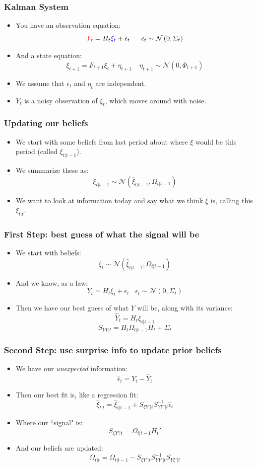 \documentclass{beamer}
\begin{document}
\begin{frame}
\frametitle[alignment=center]{Kalman System}
\begin{itemize}
\item You have an observation equation:
$$\textcolor{red}{Y_t}=H_t\textcolor{blue}{\xi_t}+\epsilon_t\ \ \ \ \ \epsilon_t\sim\mathcal{N}\left(0,\Sigma_t\right)$$
\item And a state equation:
$$\xi_{t+1}=F_{t+1}\xi_t+\eta_{t+1}\ \ \ \ \ \eta_{t+1}\sim\mathcal{N}\left(0,\Phi_{t+1}\right)$$
\item We assume that $\epsilon_t$ and $\eta_t$ are independent.
\bigskip
\item $Y_t$ is a noisy observation of $\xi_t$, which moves around with noise.
\end{itemize}
\end{frame}

\begin{frame}
\frametitle[alignment=center]{Updating our beliefs}
\begin{itemize}
\item We start with some beliefs from last period about where $\xi$ would be this period (called $\xi_{t|t-1}$).
\bigskip
\item We summarize these as:
$$\xi_{t|t-1}\sim\mathcal{N}\left(\hat{\xi}_{t|t-1},\Omega_{t|t-1}\right)$$
\item We want to look at information today and say what we think $\xi$ is, calling this $\xi_{t|t}$.
\end{itemize}
\end{frame}

\begin{frame}
\frametitle[alignment=center]{First Step: best guess of what the signal will be}
\begin{itemize}
\item We start with beliefs:
$$\xi_t\sim\mathcal{N}\left(\hat{\xi}_{t|t-1},\Omega_{t|t-1}\right)$$
\item And we know, as a law:
$$Y_t=H_t\xi_t+\epsilon_t\ \ \ \ \epsilon_t\sim\mathcal{N}(0,\Sigma_t)$$
\item Then we have our best guess of what $Y$ will be, along with its variance:
$$\hat{Y}_t=H_t\xi_{t|t-1}$$
$$S_{YY|t}=H_t\Omega_{t|t-1}H_t+\Sigma_t$$
\end{itemize}
\end{frame}


\begin{frame}
\frametitle[alignment=center]{Second Step: use surprise info to update prior beliefs}
\begin{itemize}
\item We have our \emph{unexpected} information:
$$\hat{\epsilon}_t=Y_t-\hat{Y}_t$$
\item Then our best fit is, like a regression fit:
$$\hat{\xi}_{t|t}=\hat{\xi}_{t|t-1}+S_{\xi Y'|t}S_{YY'|t}^{-1}\hat{\epsilon}_t$$
\item Where our ``signal" is:
$$S_{\xi Y'|t}=\Omega_{t|t-1}H_t'$$
\item And our beliefs are updated:
$$\Omega_{t|t}=\Omega_{t|t-1}-S_{\xi Y'|t}S_{YY'|t}^{-1}S_{Y\xi'|t}$$
\end{itemize}
\end{frame}
\end{document}
